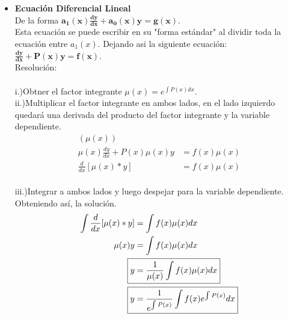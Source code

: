 \documentclass{article}
\begin{document}
\begin{itemize}
    \item \textbf{Ecuación Diferencial Lineal} \\
    De la forma $\boldsymbol{a_1(x)\frac{dy}{dx} + a_0(x)y = g(x)}$.\\
    Esta ecuación se puede escribir en su "forma estándar" al dividir toda la ecuación 
    entre $a_1(x)$. Dejando asi la siguiente ecuación: 
    $\boldsymbol{\frac{dy}{dx} + P(x)y = f(x)}$.\\
    Resolución:\\
    \\i.)Obtner el factor integrante $\mu(x) = e^{\int P(x) dx}$.
    \\ii.)Multiplicar el factor integrante en ambos lados, en el 
    lado izquierdo quedará una derivada del producto del factor 
    integrante y la variable dependiente.\\
    \begin{align*}
        [ \frac{dy}{dx} + P(x)y & = f(x) ] ( \mu(x) ) \\
        \mu(x)\frac{dy}{dx} + P(x)\mu(x)y & = f(x)\mu(x) \\
        \frac{d}{dx} [ \mu(x)*y ] & = f(x)\mu(x)
    \end{align*}
    \\iii.)Integrar a ambos lados y luego despejar para la variable dependiente. 
    Obteniendo así, la solución.\\
    \begin{align*}
        \int \frac{d}{dx} [ \mu(x)*y ] & = \int f(x)\mu(x) dx \\
        \mu(x)y & = \int f(x)\mu(x) dx \\
        \Aboxed{ y & = \frac{1}{\mu(x)}\int f(x)\mu(x) dx } \\
        \Aboxed{ y & = \frac{1}{e^{\int P(x)}}\int f(x)e^{\int P(x)} dx } \\
    \end{align*}


\end{itemize}
\end{document}
